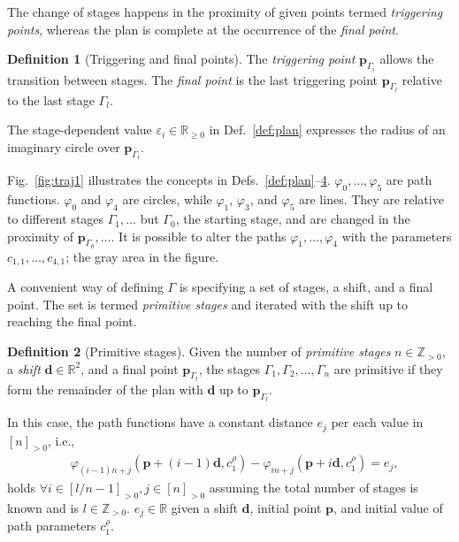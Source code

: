 \documentclass[letterpaper,10pt,journal,twoside]{IEEEtran}
\theoremstyle{definition}
\newtheorem{defn}{Definition}[section]
\begin{document}
The change of stages happens in the proximity of given points termed \emph{triggering points}, whereas the plan is complete at the occurrence of the \emph{final point}.

\begin{defn}[Triggering and final points]
  \label{def:trigs}
  The \emph{triggering point} $\mathbf{p}_{\Gamma_{i}}$ allows the transition between stages. The \emph{final point} is the last triggering point $\mathbf{p}_{\Gamma_{l}}$ relative to the last stage $\Gamma_l$.
\end{defn}

The stage-dependent value $\varepsilon_i\in\mathbb{R}_{\geq 0}$ in Def.~\ref{def:plan} expresses the radius of an imaginary circle over $\mathbf{p}_{\Gamma_i}$.

Fig.~\ref{fig:traj1} illustrates the concepts in Defs.~\ref{def:plan}--\hyperref[def:trigs]{4}. $\varphi_0,\dots,\varphi_5$ are path functions. $\varphi_0$ and $\varphi_4$ are circles, while $\varphi_1$, $\varphi_3$, and $\varphi_5$ are lines. They are relative to different stages $\Gamma_1,\dots$ but $\Gamma_0$, the starting stage, and are changed in the proximity of $\mathbf{p}_{\Gamma_0},\dots$. %
It is possible to alter the paths $\varphi_1,\dots,\varphi_4$ with the parameters $c_{1,1},\dots,c_{4,1}$; the gray area in the figure. %

A convenient way of defining $\Gamma$ is specifying a set of stages, a shift, and a final point. The set is termed \emph{primitive stages} and iterated with the shift up to reaching the final point.

\begin{defn}[Primitive stages]
  \label{def:primitive}
  Given the number of \emph{primitive stages} $n\in\mathbb{Z}_{>0}$, a \emph{shift} $\mathbf{d}\in\mathbb{R}^2$, and a final point $\mathbf{p}_{\Gamma_l}$, the stages $\Gamma_1,\Gamma_2,\dots,\Gamma_n$ %
  are primitive if they form the remainder of the plan with $\mathbf{d}$ up to $\mathbf{p}_{\Gamma_l}$. 
\end{defn}

In this case, the path functions have a constant distance $e_j$ per each value in $[n]_{>0}$, i.e., 
\begin{equation}\label{eq:primitive}\begin{split}
  &\varphi_{(i-1)n+j}(\mathbf{p}+(i-1)\mathbf{d},c_1^\rho)-\varphi_{in+j}(\mathbf{p}+i\mathbf{d},c_1^\rho)=e_j,
\end{split}\end{equation}
holds $\forall i\in[l/n-1]_{>0},j\in[n]_{>0}$ assuming the total number of stages is known and is $l\in\mathbb{Z}_{>0}$. $e_j\in\mathbb{R}$ given a shift $\mathbf{d}$, initial point $\mathbf{p}$, and initial value of path parameters $c_1^\rho$.
\end{document}
